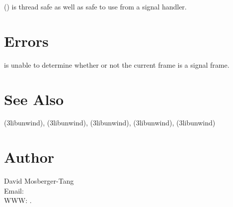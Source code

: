 \documentclass{article}
\begin{document}
() is thread safe as well as safe to use
from a signal handler.

\section{Errors}

\begin{Description}
\item[\Const{UNW\_ENOINFO}]  is unable to determine
  whether or not the current frame is a signal frame.
\end{Description}

\section{See Also}

(3libunwind),
(3libunwind),
(3libunwind),
(3libunwind),
(3libunwind)

\section{Author}

\noindent
David Mosberger-Tang\\
Email: \\
WWW: .
\LatexManEnd
\end{document}
